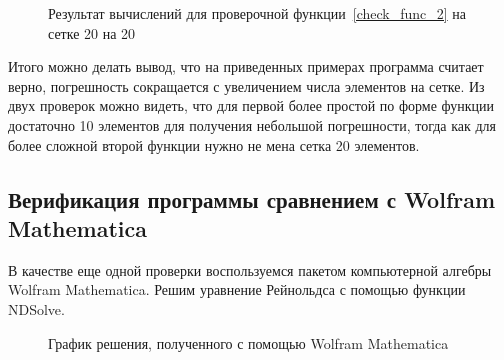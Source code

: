 \documentclass[a4paper,14pt]{extarticle}
\begin{document}
\begin{figure}[!htbp]
	\caption{Результат вычислений для проверочной функции~\eqref{check_func_2} на сетке 20 на 20}
	\label{res_check_func_2}
\end{figure}


Итого можно делать вывод, что на приведенных примерах программа считает верно, погрешность сокращается с увеличением числа элементов на сетке. Из двух проверок можно видеть, что для первой более простой по форме функции достаточно 10 элементов для получения небольшой погрешности, тогда как для более сложной второй функции нужно не мена сетка 20 элементов.



\subsection{Верификация программы сравнением с Wolfram Mathematica}

В качестве еще одной проверки воспользуемся пакетом компьютерной алгебры Wolfram Mathematica.
Решим уравнение Рейнольдса с помощью функции NDSolve.

\begin{figure}[!htbp]
	\caption{График решения, полученного с помощью Wolfram Mathematica}
	\label{w_sol}
\end{figure}
\end{document}
